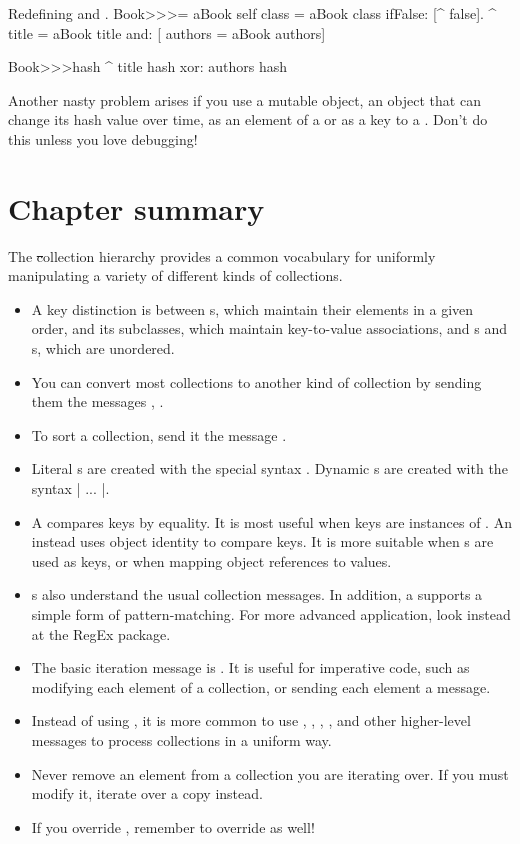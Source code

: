 \documentclass[a4paper,10pt,twoside]{book}
\begin{document}
\begin{method}{Redefining \lct{=} and .}
Book>>>= aBook
   self class = aBook class ifFalse: [^ false].
   ^ title = aBook title and: [ authors = aBook authors]

Book>>>hash 
   ^ title hash xor: authors hash
\end{method}

Another nasty problem arises if you use a mutable object, \ie an object that can change its hash value over time, as an element of a  or as a key to a .
Don't do this unless you love debugging!

\section{Chapter summary}

The \st collection hierarchy provides a common vocabulary for uniformly manipulating a variety of different kinds of collections.

\begin{itemize}
  \item A key distinction is between s, which maintain their elements in a given order,  and its subclasses, which maintain key-to-value associations, and s and s, which are unordered.
  \item You can convert most collections to another kind of collection by sending them the messages ,  \etc.
  \item To sort a collection, send it the message .
  \item Literal s are created with the special syntax .  Dynamic s are created with the syntax \ct|{ ... }|.
  \item A  compares keys by equality. It is most useful when keys are instances of . An  instead uses object identity to compare keys.  It is more suitable when s are used as keys, or when mapping object references to values.
  \item {}s also understand the usual collection messages.  In addition, a  supports a simple form of pattern-matching. For more advanced application, look instead at the RegEx package.
  \item The basic iteration message is . It is useful for imperative code, such as modifying each element of a collection, or sending each element a message.
  \item Instead of using , it is more common to use , , , ,  and other higher-level messages to process collections in a uniform way.
  \item Never remove an element from a collection you are iterating over. If you must modify it, iterate over a copy instead.
  \item If you override \ct{=}, remember to override  as well!
\end{itemize}

\ifx\wholebook\relax\else
   
   
\end{document}

